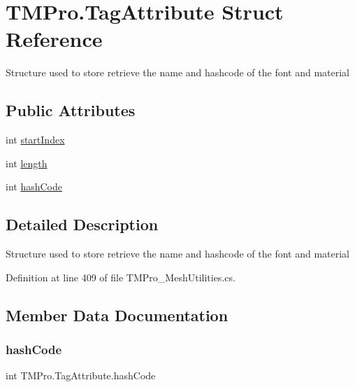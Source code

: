 \hypertarget{struct_t_m_pro_1_1_tag_attribute}{}\section{T\+M\+Pro.\+Tag\+Attribute Struct Reference}
\label{struct_t_m_pro_1_1_tag_attribute}


Structure used to store retrieve the name and hashcode of the font and material  


\subsection*{Public Attributes}
\begin{DoxyCompactItemize}
\item 
int \mbox{\hyperlink{struct_t_m_pro_1_1_tag_attribute_a4a3aad3a5e591a027eec78d4298d41d3}{start\+Index}}
\item 
int \mbox{\hyperlink{struct_t_m_pro_1_1_tag_attribute_a6820685a6bbbae1fef75a97e73a46886}{length}}
\item 
int \mbox{\hyperlink{struct_t_m_pro_1_1_tag_attribute_a83039e6bf178719181ef5969a836e20e}{hash\+Code}}
\end{DoxyCompactItemize}


\subsection{Detailed Description}
Structure used to store retrieve the name and hashcode of the font and material 



Definition at line 409 of file T\+M\+Pro\+\_\+\+Mesh\+Utilities.\+cs.



\subsection{Member Data Documentation}
\mbox{\label{struct_t_m_pro_1_1_tag_attribute_a83039e6bf178719181ef5969a836e20e}} 
\subsubsection{\texorpdfstring{hashCode}{hashCode}}
{\footnotesize\ttfamily int T\+M\+Pro.\+Tag\+Attribute.\+hash\+Code}



